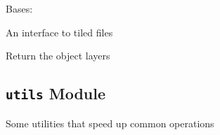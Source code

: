 \documentclass[letterpaper,10pt,english]{sphinxmanual}
\begin{document}

\begin{fulllineitems}
\label{blocks:serge.blocks.tiled.Tiled}
Bases: {\hyperref[blocks:serge.blocks.tiled.TileMap]{}}

An interface to tiled files

\begin{fulllineitems}
\label{blocks:serge.blocks.tiled.Tiled.getObjectLayers}
Return the object layers

\end{fulllineitems}


\begin{fulllineitems}
\label{blocks:serge.blocks.tiled.Tiled.layer_types}
\end{fulllineitems}


\end{fulllineitems}



\subsection{\texttt{utils} Module}
\label{blocks:module-serge.blocks.utils}\label{blocks:utils-module}
Some utilities that speed up common operations
\end{document}
